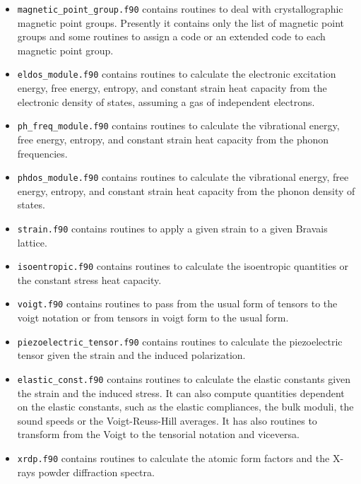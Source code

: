 \documentclass[12pt,a4paper]{article}
\begin{document}
\begin{itemize}
\item
\texttt{magnetic\_point\_group.f90} contains routines to deal with crystallographic
magnetic point groups. Presently it contains only the list of magnetic
point groups and some routines to assign a code or an extended code to each
magnetic point group.

\item
\texttt{eldos\_module.f90} contains routines to calculate the electronic
excitation energy, free energy, entropy, and constant strain heat capacity
from the electronic density of states, assuming a gas of independent 
electrons.   

\item
\texttt{ph\_freq\_module.f90} contains routines to calculate the vibrational
energy, free energy, entropy, and constant strain heat capacity from the
phonon frequencies.   

\item
\texttt{phdos\_module.f90} contains routines to calculate the vibrational
energy, free energy, entropy, and constant strain heat capacity from the
phonon density of states.

\item
\texttt{strain.f90} contains routines to apply a given strain to a given
Bravais lattice.

\item
\texttt{isoentropic.f90} contains routines to calculate the isoentropic
quantities or the constant stress heat capacity.

\item
\texttt{voigt.f90} contains routines to pass from the usual form of tensors
to the voigt notation or from tensors in voigt form to the usual form.

\item
\texttt{piezoelectric\_tensor.f90} contains routines to calculate the
piezoelectric tensor given the strain and the induced polarization.

\item
\texttt{elastic\_const.f90} contains routines to calculate the elastic
constants given the strain and the induced stress. It can also compute
quantities dependent on the elastic constants, such as the elastic 
compliances, the bulk moduli, the sound speeds or the Voigt-Reuss-Hill 
averages. It has also routines to transform from the Voigt to the 
tensorial notation and viceversa.

\item
\texttt{xrdp.f90} contains routines to calculate the atomic form factors 
and the X-rays powder diffraction spectra.


\end{itemize}
\end{document}
